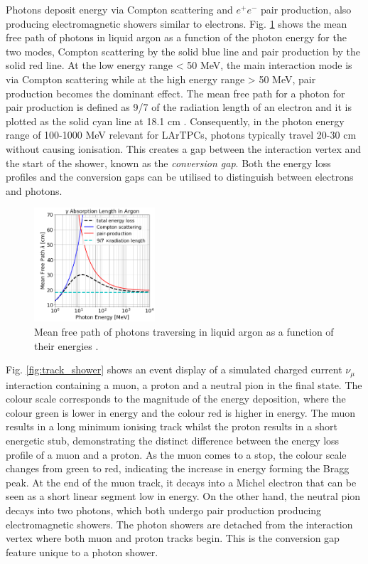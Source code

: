 Photons deposit energy via Compton scattering and $e^+e^-$ pair production, also producing electromagnetic showers similar to electrons.
Fig. \ref{fig:uboone_gamma} shows the mean free path of photons in liquid argon as a function of the photon energy for the two modes, Compton scattering by the solid blue line and pair production by the solid red line.
At the low energy range < 50 MeV, the main interaction mode is via Compton scattering while at the high energy range > 50 MeV, pair production becomes the dominant effect.
The mean free path for a photon for pair production is defined as 9/7 of the radiation length of an electron and it is plotted as the solid cyan line at 18.1 cm \cite{Passage}.
Consequently, in the photon energy range of 100-1000 MeV relevant for LArTPCs, photons typically travel 20-30 cm without causing ionisation.
This creates a gap between the interaction vertex and the start of the shower, known as the \textit{conversion gap}.
Both the energy loss profiles and the conversion gaps can be utilised to distinguish between electrons and photons. 

\begin{figure}[ht!] 
\centering    
\includegraphics[width=0.4\textwidth]{uboone_gamma}
\caption[Mean Free Path of Photons in Liquid Argon]{
Mean free path of photons traversing in liquid argon as a function of their energies \cite{uboone_gamma}.
}
\label{fig:uboone_gamma}
\end{figure}

Fig. \ref{fig:track_shower} shows an event display of a simulated charged current $\nu_{\mu}$ interaction containing a muon, a proton and a neutral pion in the final state.
The colour scale corresponds to the magnitude of the energy deposition, where the colour green is lower in energy and the colour red is higher in energy.
The muon results in a long minimum ionising track whilst the proton results in a short energetic stub, demonstrating the distinct difference between the energy loss profile of a muon and a proton.
As the muon comes to a stop, the colour scale changes from green to red, indicating the increase in energy forming the Bragg peak.
At the end of the muon track, it decays into a Michel electron that can be seen as a short linear segment low in energy. 
On the other hand, the neutral pion decays into two photons, which both undergo pair production producing electromagnetic showers.
The photon showers are detached from the interaction vertex where both muon and proton tracks begin.
This is the conversion gap feature unique to a photon shower.

